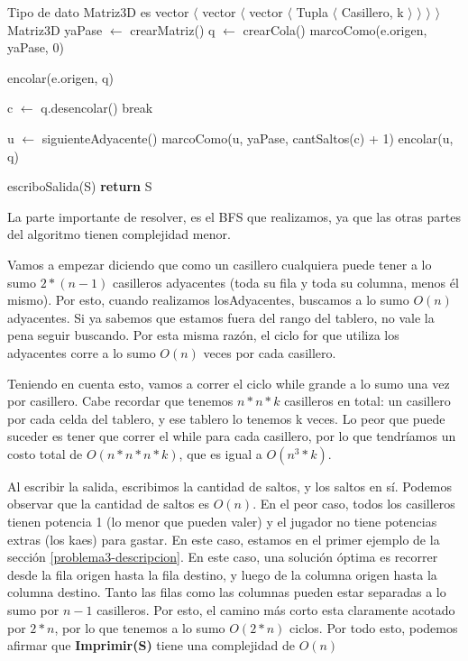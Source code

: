 \begin{pseudo}
\State Tipo de dato Matriz3D es vector $\langle$ vector $\langle$ vector $\langle$ Tupla $\langle$ Casillero, k $\rangle$ $\rangle$ $\rangle$ $\rangle$
        \State Matriz3D yaPase $\leftarrow$ crearMatriz() 
		\State q $\leftarrow$ crearCola() 
		\State marcoComo(e.origen, yaPase, 0) 
		
		\State encolar(e.origen, q) 
		
		 
			\State c $\leftarrow$ q.desencolar() 
				\State break
			\EndIf
			
			 
				\State u $\leftarrow$ siguienteAdyacente() 
        		 
					\State marcoComo(u, yaPase, cantSaltos(c) + 1) 
					\State encolar(u, q) 
				\EndIf
      		\EndFor
		\EndWhile

      	escriboSalida(S) 
      	\State \textbf{return} S
        
    \EndProcedure
\end{pseudo}

La parte importante de resolver, es el BFS que realizamos, ya que las otras partes del algoritmo tienen complejidad menor.

Vamos a empezar diciendo que como un casillero cualquiera puede tener a lo sumo $2*(n-1)$ casilleros adyacentes (toda su fila y toda su columna, menos él mismo). Por esto, cuando realizamos losAdyacentes, buscamos a lo sumo $O(n)$ adyacentes. Si ya sabemos que estamos fuera del rango del tablero, no vale la pena seguir buscando. Por esta misma razón, el ciclo for que utiliza los adyacentes corre a lo sumo $O(n)$ veces por cada casillero.

Teniendo en cuenta esto, vamos a correr el ciclo while grande a lo sumo una vez por casillero. Cabe recordar que tenemos $n*n*k$ casilleros en total: un casillero por cada celda del tablero, y ese tablero lo tenemos k veces. Lo peor que puede suceder es tener que correr el while para cada casillero, por lo que tendríamos un costo total de $O(n*n*n*k)$, que es igual a $O(n^3*k)$.

Al escribir la salida, escribimos la cantidad de saltos, y los saltos en sí. Podemos observar que la cantidad de saltos es $O(n)$. En el peor caso, todos los casilleros tienen potencia 1 (lo menor que pueden valer) y el jugador no tiene potencias extras (los kaes) para gastar. En este caso, estamos en el primer ejemplo de la sección  \ref{problema3-descripcion}. En este caso, una solución óptima es recorrer desde la fila origen hasta la fila destino, y luego de la columna origen hasta la columna destino. Tanto las filas como las columnas pueden estar separadas a lo sumo por $n-1$ casilleros. Por esto, el camino más corto esta claramente acotado por $2*n$, por lo que tenemos a lo sumo $O(2*n)$ ciclos. Por todo esto, podemos afirmar que \textbf{Imprimir(S)} tiene una complejidad de $O(n)$

